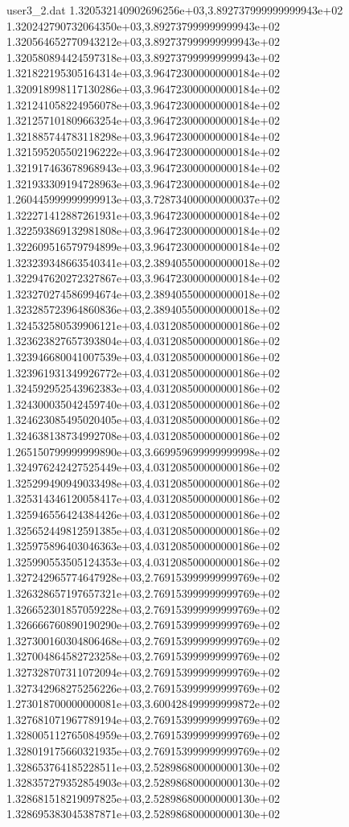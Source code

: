 \begin{filecontents}{user3_2.dat}
1.320532140902696256e+03,3.892737999999999943e+02
1.320242790732064350e+03,3.892737999999999943e+02
1.320564652770943212e+03,3.892737999999999943e+02
1.320580894424597318e+03,3.892737999999999943e+02
1.321822195305164314e+03,3.964723000000000184e+02
1.320918998117130286e+03,3.964723000000000184e+02
1.321241058224956078e+03,3.964723000000000184e+02
1.321257101809663254e+03,3.964723000000000184e+02
1.321885744783118298e+03,3.964723000000000184e+02
1.321595205502196222e+03,3.964723000000000184e+02
1.321917463678968943e+03,3.964723000000000184e+02
1.321933309194728963e+03,3.964723000000000184e+02
1.260445999999999913e+03,3.728734000000000037e+02
1.322271412887261931e+03,3.964723000000000184e+02
1.322593869132981808e+03,3.964723000000000184e+02
1.322609516579794899e+03,3.964723000000000184e+02
1.323239348663540341e+03,2.389405500000000018e+02
1.322947620272327867e+03,3.964723000000000184e+02
1.323270274586994674e+03,2.389405500000000018e+02
1.323285723964860836e+03,2.389405500000000018e+02
1.324532580539906121e+03,4.031208500000000186e+02
1.323623827657393804e+03,4.031208500000000186e+02
1.323946680041007539e+03,4.031208500000000186e+02
1.323961931349926772e+03,4.031208500000000186e+02
1.324592952543962383e+03,4.031208500000000186e+02
1.324300035042459740e+03,4.031208500000000186e+02
1.324623085495020405e+03,4.031208500000000186e+02
1.324638138734992708e+03,4.031208500000000186e+02
1.265150799999999890e+03,3.669959699999999998e+02
1.324976242427525449e+03,4.031208500000000186e+02
1.325299490949033498e+03,4.031208500000000186e+02
1.325314346120058417e+03,4.031208500000000186e+02
1.325946556424384426e+03,4.031208500000000186e+02
1.325652449812591385e+03,4.031208500000000186e+02
1.325975896403046363e+03,4.031208500000000186e+02
1.325990553505124353e+03,4.031208500000000186e+02
1.327242965774647928e+03,2.769153999999999769e+02
1.326328657197657321e+03,2.769153999999999769e+02
1.326652301857059228e+03,2.769153999999999769e+02
1.326666760890190290e+03,2.769153999999999769e+02
1.327300160304806468e+03,2.769153999999999769e+02
1.327004864582723258e+03,2.769153999999999769e+02
1.327328707311072094e+03,2.769153999999999769e+02
1.327342968275256226e+03,2.769153999999999769e+02
1.273018700000000081e+03,3.600428499999999872e+02
1.327681071967789194e+03,2.769153999999999769e+02
1.328005112765084959e+03,2.769153999999999769e+02
1.328019175660321935e+03,2.769153999999999769e+02
1.328653764185228511e+03,2.528986800000000130e+02
1.328357279352854903e+03,2.528986800000000130e+02
1.328681518219097825e+03,2.528986800000000130e+02
1.328695383045387871e+03,2.528986800000000130e+02

\end{filecontents}
